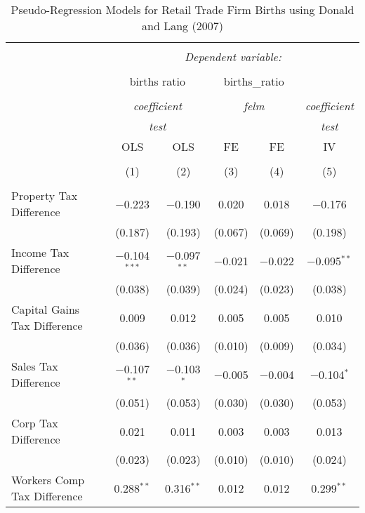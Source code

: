 
\begin{table}[!htbp] \centering 
  \caption{Pseudo-Regression Models for  Retail Trade Firm Births using Donald and Lang (2007)} 
  \label{} 
\begin{tabular}{@{\extracolsep{5pt}}lccccc} 
\\[-1.8ex]\hline 
\hline \\[-1.8ex] 
 & \multicolumn{5}{c}{\textit{Dependent variable:}} \\ 
\cline{2-6} 
\\[-1.8ex] & \multicolumn{2}{c}{births ratio} & \multicolumn{2}{c}{births\_ratio} &   \\ 
\\[-1.8ex] & \multicolumn{2}{c}{\textit{coefficient}} & \multicolumn{2}{c}{\textit{felm}} & \textit{coefficient} \\ 
 & \multicolumn{2}{c}{\textit{test}} & \multicolumn{2}{c}{\textit{}} & \textit{test} \\ 
 & OLS & OLS & FE & FE & IV \\ 
\\[-1.8ex] & (1) & (2) & (3) & (4) & (5)\\ 
\hline \\[-1.8ex] 
 Property Tax Difference & $-$0.223 & $-$0.190 & 0.020 & 0.018 & $-$0.176 \\ 
  & (0.187) & (0.193) & (0.067) & (0.069) & (0.198) \\ 
  Income Tax Difference & $-$0.104$^{***}$ & $-$0.097$^{**}$ & $-$0.021 & $-$0.022 & $-$0.095$^{**}$ \\ 
  & (0.038) & (0.039) & (0.024) & (0.023) & (0.038) \\ 
  Capital Gains Tax Difference & 0.009 & 0.012 & 0.005 & 0.005 & 0.010 \\ 
  & (0.036) & (0.036) & (0.010) & (0.009) & (0.034) \\ 
  Sales Tax Difference & $-$0.107$^{**}$ & $-$0.103$^{*}$ & $-$0.005 & $-$0.004 & $-$0.104$^{*}$ \\ 
  & (0.051) & (0.053) & (0.030) & (0.030) & (0.053) \\ 
  Corp Tax Difference & 0.021 & 0.011 & 0.003 & 0.003 & 0.013 \\ 
  & (0.023) & (0.023) & (0.010) & (0.010) & (0.024) \\ 
  Workers Comp Tax Difference & 0.288$^{**}$ & 0.316$^{**}$ & 0.012 & 0.012 & 0.299$^{**}$ \\ 

\end{tabular}
\end{table}
